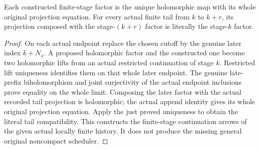\begin{theorem}
\label{hir:actual-locally-finite-history-finite-stage-factor-compatibility}
\leanok
Each constructed finite-stage factor is the unique holomorphic map with
its whole original projection equation. For every actual finite tail from
$k$ to $k+r$, its projection composed with the stage-$(k+r)$ factor is
literally the stage-$k$ factor.
\end{theorem}
\begin{proof}
On each actual endpoint replace the chosen cutoff by the genuine later
index $k+N_x$. A proposed holomorphic factor and the constructed one become
two holomorphic lifts from an actual restricted continuation of stage $k$.
Restricted lift uniqueness identifies them on that whole later endpoint.
The genuine late-prefix biholomorphism and joint surjectivity of the
actual endpoint inclusions prove equality on the whole limit. Composing
the later factor with the actual recorded tail projection is holomorphic;
the actual append identity gives its whole original projection equation.
Apply the just proved uniqueness to obtain the literal tail compatibility.
This constructs the finite-stage continuation arrows of the given actual
locally finite history. It does not produce the missing general original
noncompact scheduler.
\end{proof}

